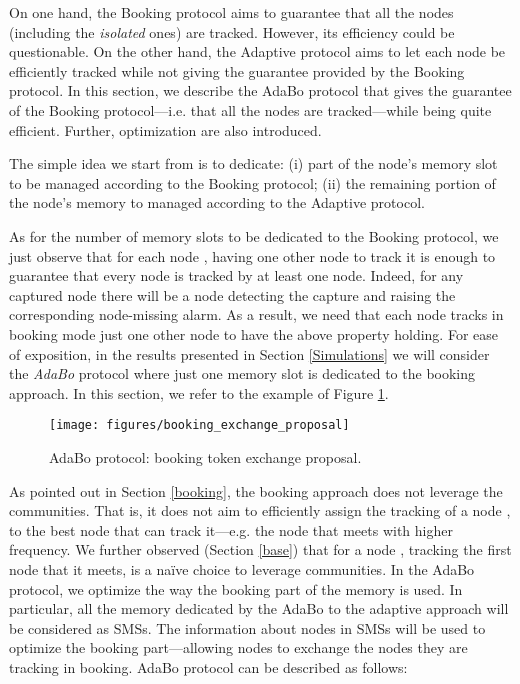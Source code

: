 \documentclass{IEEEconf}
\begin{document}
On one hand, the Booking protocol aims to guarantee that all the nodes (including the \textit{isolated} ones) are tracked. However, its efficiency could be questionable.
On the other hand, the Adaptive protocol aims to let each node be efficiently tracked while not giving the guarantee provided by the Booking protocol. In this section, we describe the AdaBo protocol that gives the guarantee of the Booking protocol---i.e. that all the nodes are tracked---while being quite efficient.
Further, optimization are also introduced.

The simple idea we start from is to dedicate: (i) part of the node's memory slot to be managed according to the Booking protocol; (ii) the remaining portion of the node's memory to managed according to the Adaptive protocol.


As for the number of memory slots to be dedicated to the Booking protocol, we just observe that for each node , having one other node to track it is enough to guarantee that every node is tracked by at least one node. Indeed, for any captured node there will be a node detecting the capture and raising the corresponding node-missing alarm.
As a result, we need that each node tracks in booking mode just one other node to have the above property holding. For ease of exposition, in the results presented in Section \ref{Simulations} we will consider the {\em AdaBo} protocol where just one memory slot is dedicated to the booking approach. In this section, we refer to the example of Figure \ref{exchangeExample}.
\begin{figure}
\begin{center}
    \texttt{[image: figures/booking\_exchange\_proposal]}
\end{center}
\caption{AdaBo protocol: booking token exchange proposal.}
\label{exchangeExample}
\end{figure}



As pointed out in Section \ref{booking}, the booking approach does not leverage the communities. That is, it does not aim to efficiently assign the tracking of a node , to the best node that can track it---e.g. the node that meets  with higher frequency. We further observed (Section \ref{base}) that for a node , tracking the first node that it meets, is a na\"ive choice to leverage communities. In the AdaBo protocol, we optimize the way the booking part of the memory is used. In particular, all the memory dedicated by the AdaBo to the adaptive approach will be considered as SMSs. The information about nodes in SMSs will be used to optimize the booking part---allowing nodes to exchange the nodes they are tracking in booking. AdaBo protocol can be described as follows:
\end{document}
